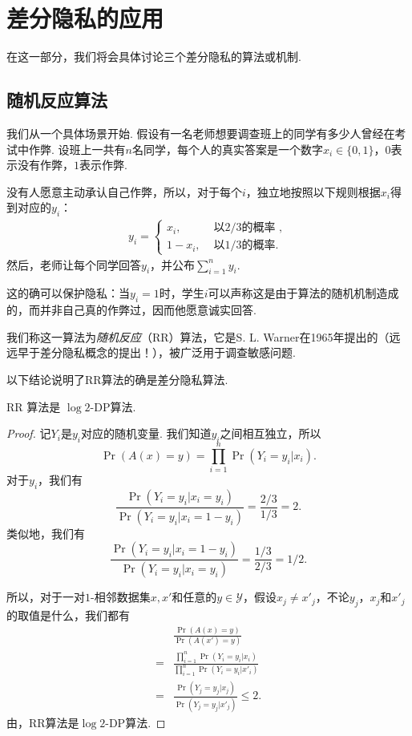 \section{差分隐私的应用}
在这一部分，我们将会具体讨论三个差分隐私的算法或机制. 

\subsection{随机反应算法}
我们从一个具体场景开始. 假设有一名老师想要调查班上的同学有多少人曾经在考试中作弊. 设班上一共有$n$名同学，每个人的真实答案是一个数字$x_i \in \{0,1\}$，$0$表示没有作弊，$1$表示作弊. 

没有人愿意主动承认自己作弊，所以，对于每个$i$，独立地按照以下规则根据$x_i$得到对应的$y_i$：
\[\begin{aligned}
    y_i =
    \begin{cases}
        x_i, & \text{ 以$2/3$的概率 }, \\
        1 - x_i,& \text{ 以$1/3$的概率}.
    \end{cases}
\end{aligned}\]
然后，老师让每个同学回答$y_i$，并公布$\sum_{i=1}^n y_i$. 

这的确可以保护隐私：当$y_i = 1$时，学生$i$可以声称这是由于算法的随机机制造成的，而并非自己真的作弊过，因而他愿意诚实回答. 

我们称这一算法为\textit{随机反应}（RR）算法，它是S. L. Warner在1965年提出的（远远早于差分隐私概念的提出！），被广泛用于调查敏感问题.

以下结论说明了RR算法的确是差分隐私算法.

\begin{theorem}
    RR 算法是 $\log 2$-DP算法.
\end{theorem}
\begin{proof}
记$Y_i$是$y_i$对应的随机变量. 我们知道$y_i$之间相互独立，所以
    \[
    \Pr(A(x) = y) = \prod_{i=1}^n \Pr(Y_i = y_i  | x_i).
    \]
对于$y_i$，我们有
    \[
    \frac{\Pr(Y_i = y_i  | x_i = y_i)}{\Pr(Y_i = y_i  | x_i = 1 - y_i)} = \frac{2/3}{1/3} = 2.
    \]
类似地，我们有
    \[
    \frac{\Pr(Y_i = y_i  | x_i = 1 - y_i)}{\Pr(Y_i = y_i  | x_i = y_i)} = \frac{1/3}{2/3} = 1/2.
    \]

所以，对于一对$1$-相邻数据集$x, x'$和任意的$y \in \mathcal Y$，假设$x_j \neq x'_j$，不论$y_j$，$x_j$和$x'_j$的取值是什么，我们都有
    \begin{align*}
    & \frac{\Pr(A(x) = y)}{\Pr(A(x') = y)} \\
    =& \frac{\prod_{i=1}^n \Pr(Y_i = y_i  | x_i)}{\prod_{i=1}^n \Pr(Y_i = y_i  | x'_i)} \\
    =& \frac{\Pr(Y_j = y_j  | x_j)}{\Pr(Y_j = y_j  | x'_j)}\leq 2.
    \end{align*}
由，RR算法是$\log 2$-DP算法.
\end{proof}


